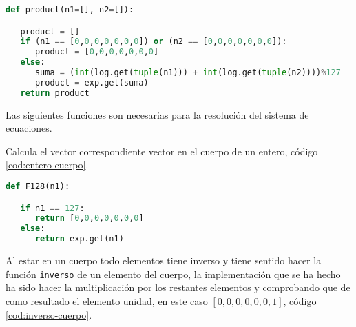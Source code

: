 \vspace{0.25cm}
\begin{lstlisting}[language=Python,caption=Producto de dos elementos del cuerpo, label=cod:producto-cuerpo]
def product(n1=[], n2=[]):

   product = []
   if (n1 == [0,0,0,0,0,0,0]) or (n2 == [0,0,0,0,0,0,0]):
      product = [0,0,0,0,0,0,0]
   else:
      suma = (int(log.get(tuple(n1))) + int(log.get(tuple(n2))))%127
      product = exp.get(suma)
   return product
\end{lstlisting}


Las siguientes funciones son necesarias para la resolución del sistema de ecuaciones.


Calcula el vector correspondiente vector en el cuerpo de un entero, código \ref{cod:entero-cuerpo}.


\begin{table}[h]
	\begin{center}
	\centering
	\end{center}
	\caption{Parámetros de la función \texttt{F128}}
\end{table}
\vspace{0.25cm}

\begin{lstlisting}[language=Python,caption=Convierte un entero en un elemento del cuerpo, label=cod:entero-cuerpo]
def F128(n1):

   if n1 == 127:
      return [0,0,0,0,0,0,0]
   else:
      return exp.get(n1)
\end{lstlisting}


Al estar en un cuerpo todo elementos tiene inverso y tiene sentido hacer la función \texttt{inverso} de un elemento del cuerpo, la implementación que se ha hecho ha sido hacer la multiplicación por los restantes elementos y comprobando que de como resultado el elemento unidad, en este caso $[0,0,0,0,0,0,1]$, código \ref{cod:inverso-cuerpo}.

